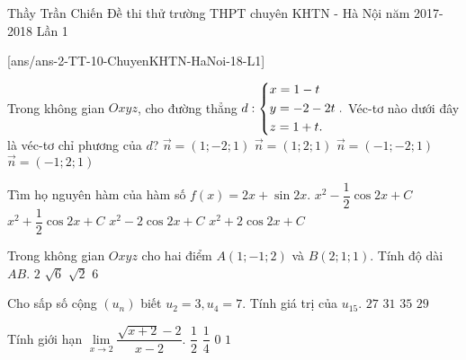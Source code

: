 \begin{name}
{Thầy Trần Chiến}
{Đề thi thử trường THPT chuyên KHTN - Hà Nội năm 2017-2018 Lần 1}
\end{name}
\setcounter{ex}{0}\setcounter{bt}{0}
[ans/ans-2-TT-10-ChuyenKHTN-HaNoi-18-L1]

\begin{ex}%
		Trong không gian $Oxyz$, cho đường thẳng $d: \left\{\begin{aligned}& x=1-t\\&y=-2-2t\\& z=1+t.\end{aligned}\right.. $ Véc-tơ nào dưới đây là véc-tơ chỉ phương của $d$? 
		\choice
		{$\vec{n}=(1;-2;1)$}
		{$\vec{n}=(1;2;1)$}
		{\True $\vec{n}=(-1;-2;1)$}
		{$\vec{n}=(-1;2;1)$}
\end{ex}
	
	
\begin{ex}%
	Tìm họ nguyên hàm của hàm số $f(x)=2x+\sin 2x$.
		\choice
		{\True $x^2-\dfrac{1}{2}\cos 2x+C$}
		{$x^2+\dfrac{1}{2}\cos 2x+C$}
		{$x^2-2\cos 2x+C$}
		{$x^2+2\cos 2x+C$}
\end{ex}
	
\begin{ex}%
		Trong không gian $Oxyz$ cho hai điểm $A(1;-1;2)$ và $B(2;1;1)$. Tính độ dài $AB$.
		\choice
		{$2$}
		{\True $\sqrt{6}$}
		{$\sqrt{2}$}
		{$6$}
\end{ex}
	
\begin{ex}%
		Cho sấp số cộng $(u_n) $ biết $u_2=3, u_4=7$. Tính giá trị của $u_{15}$.
		\choice
		{$27$}
		{$31$}
		{$35$}
		{\True $29$}
\end{ex}
	
\begin{ex}%
		Tính giới hạn $\lim\limits_{x\to 2} \dfrac{\sqrt{x+2}-2}{x-2}$.
		\choice
		{$\dfrac{1}{2}$}
		{\True $\dfrac{1}{4}$}
		{$0$}
		{$1$}
\end{ex}
	
